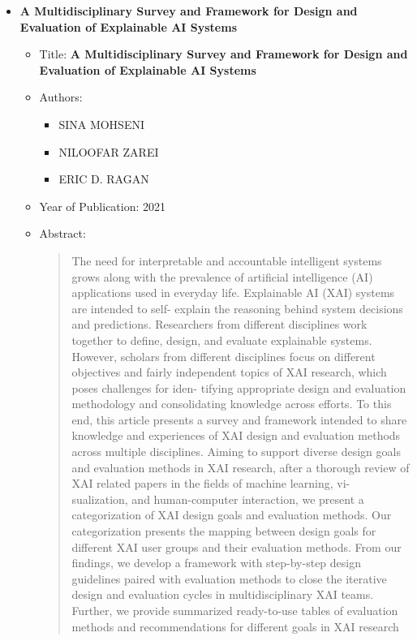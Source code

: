 \documentclass{article}
\begin{document}
\begin{itemize}
        \item \textbf{A Multidisciplinary Survey and Framework for Design and
        Evaluation of Explainable AI Systems}
        \begin{itemize}
            \item Title: \textbf{A Multidisciplinary Survey and Framework for Design and
            Evaluation of Explainable AI Systems}
            \item Authors:
            \begin{itemize}
                \item SINA MOHSENI
                \item NILOOFAR ZAREI
                \item ERIC D. RAGAN
            \end{itemize}
            \item Year of Publication: 2021
            \item Abstract:
            \begin{abstract}
                The need for interpretable and accountable intelligent systems grows along with the prevalence of artificial
                intelligence (AI) applications used in everyday life. Explainable AI (XAI) systems are intended to self-
                explain the reasoning behind system decisions and predictions. Researchers from different disciplines work
                together to define, design, and evaluate explainable systems. However, scholars from different disciplines
                focus on different objectives and fairly independent topics of XAI research, which poses challenges for iden-
                tifying appropriate design and evaluation methodology and consolidating knowledge across efforts. To this
                end, this article presents a survey and framework intended to share knowledge and experiences of XAI design
                and evaluation methods across multiple disciplines. Aiming to support diverse design goals and evaluation
                methods in XAI research, after a thorough review of XAI related papers in the fields of machine learning, vi-
                sualization, and human-computer interaction, we present a categorization of XAI design goals and evaluation
                methods. Our categorization presents the mapping between design goals for different XAI user groups and
                their evaluation methods. From our findings, we develop a framework with step-by-step design guidelines
                paired with evaluation methods to close the iterative design and evaluation cycles in multidisciplinary XAI
                teams. Further, we provide summarized ready-to-use tables of evaluation methods and recommendations for
                different goals in XAI research
            \end{abstract}
        \end{itemize}
        

\end{itemize}
\end{document}
